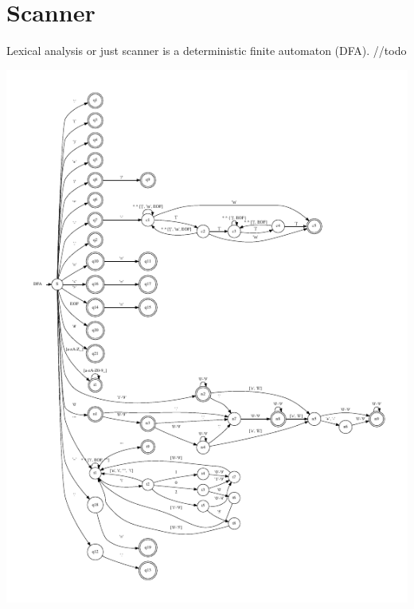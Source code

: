 \section{Scanner}


\begin{enumerate}
    Lexical analysis or just scanner is a deterministic finite automaton (DFA).
    //todo
\end{enumerate}
\includegraphics[scale=1.7]{fig/scanner.pdf}

